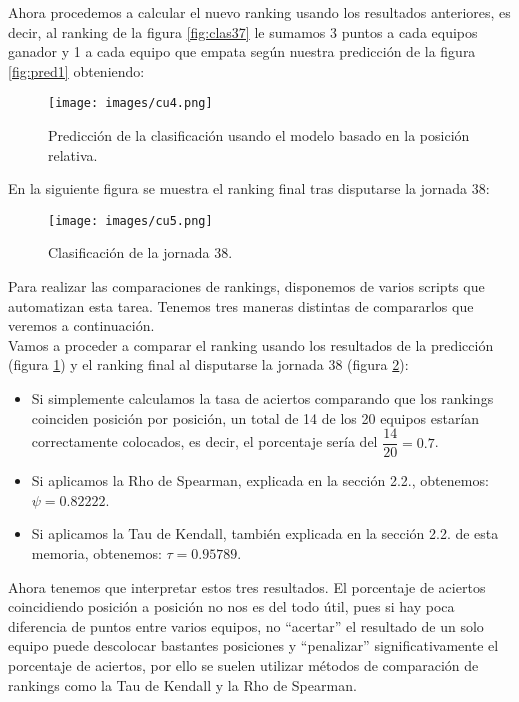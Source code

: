 Ahora procedemos a calcular el nuevo ranking usando los resultados anteriores, es decir, al ranking de la figura \ref{fig:clas37} le sumamos 3 puntos a cada equipos ganador y 1 a cada equipo que empata según nuestra predicción de la figura \ref{fig:pred1} obteniendo:\\


\begin{figure}[H]
	\centering
	\texttt{[image: images/cu4.png]}
	\caption{Predicción de la clasificación usando el modelo basado en la posición relativa.} \label{fig:predclas1}
\end{figure}

\newpage
En la siguiente figura se muestra el ranking final tras disputarse la jornada 38:
\begin{figure}[H]
	\centering
	\texttt{[image: images/cu5.png]}
	\caption{Clasificación de la jornada 38.} \label{fig:clas38}
\end{figure}

Para realizar las comparaciones de rankings, disponemos de varios scripts que automatizan esta tarea. Tenemos tres maneras distintas de compararlos que veremos a continuación.\\

Vamos a proceder a comparar el ranking usando los resultados de la predicción (figura \ref{fig:predclas1}) y el ranking final al disputarse la jornada 38 (figura \ref{fig:clas38}): 
\begin{itemize}
	\item Si simplemente calculamos la tasa de aciertos comparando que los rankings coinciden posición por posición, un total de 14 de los 20 equipos estarían correctamente colocados, es decir, el porcentaje sería del $\dfrac{14}{20}=0.7$.  
	\item Si aplicamos la Rho de Spearman, explicada en la sección 2.2., obtenemos: $\psi = 0.82222$.
	\item Si aplicamos la Tau de Kendall, también explicada en la sección 2.2. de esta memoria, obtenemos: $\tau = 0.95789$.
\end{itemize}

Ahora tenemos que interpretar estos tres resultados. El porcentaje de aciertos coincidiendo posición a posición no nos es del todo útil, pues si hay poca diferencia de puntos entre varios equipos, no ``acertar'' el resultado de un solo equipo puede descolocar bastantes posiciones y ``penalizar'' significativamente el porcentaje de aciertos, por ello se suelen utilizar métodos de comparación de rankings como la Tau de Kendall y la Rho de Spearman. \\

